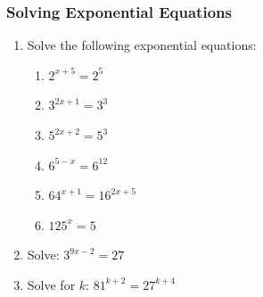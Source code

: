     \noindent
  
\label{m39253*secfhsst!!!underscore!!!id3894}
            \subsubsection{  Solving Exponential Equations }
            \nopagebreak
            
          \label{m39253*id156597}\begin{enumerate}[noitemsep, label=\textbf{\arabic*}. ] 
            \label{m39253*uid71}\item Solve the following exponential equations:
\label{m39253*id7342}\begin{enumerate}[noitemsep, label=\textbf{\alph*}. ] 
            \item \begin{math}{2}^{x+5}={2}^{5}\end{math}\item \begin{math}{3}^{2x+1}={3}^{3}\end{math}\item \begin{math}{5}^{2x+2}={5}^{3}\end{math}\item \begin{math}{6}^{5-x}={6}^{12}\end{math}\item \begin{math}{64}^{x+1}={16}^{2x+5}\end{math}\item \begin{math}{125}^{x}=5\end{math}\end{enumerate}
                
\label{m39253*uid72}\item Solve: \begin{math}{3}^{9x-2}=27\end{math}\newline
            
\label{m39253*uid73}\item Solve for \begin{math}k\end{math}: \begin{math}{81}^{k+2}={27}^{k+4}\end{math}\newline
            

\end{enumerate}
